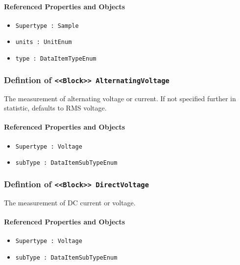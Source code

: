 \FloatBarrier
\paragraph{Referenced Properties and Objects}

\begin{itemize}
\item \texttt{Supertype : Sample}

\item \texttt{units : UnitEnum}

\item \texttt{type : DataItemTypeEnum}

\end{itemize}
\FloatBarrier
\subsubsection{Defintion of \texttt{<<Block>> AlternatingVoltage}}
  \label{type:AlternatingVoltage}

\FloatBarrier

The measurement of alternating voltage or current.   If not specified further in statistic, defaults to RMS voltage. 

\FloatBarrier
\paragraph{Referenced Properties and Objects}

\begin{itemize}
\item \texttt{Supertype : Voltage}

\item \texttt{subType : DataItemSubTypeEnum}

\end{itemize}
\FloatBarrier
\subsubsection{Defintion of \texttt{<<Block>> DirectVoltage}}
  \label{type:DirectVoltage}

\FloatBarrier

The measurement of DC current or voltage.

\FloatBarrier
\paragraph{Referenced Properties and Objects}

\begin{itemize}
\item \texttt{Supertype : Voltage}

\item \texttt{subType : DataItemSubTypeEnum}

\end{itemize}
\FloatBarrier
